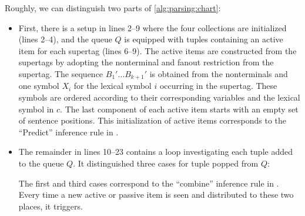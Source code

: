 \documentclass[../../document.tex]{subfiles}
\begin{document}
    Roughly, we can distinguish two parts of \cref{alg:parsing:chart}:
    \begin{itemize}
        \item First, there is a setup in lines 2--9 where the four collections are initialized (lines 2--4), and the queue \(Q\) is equipped with tuples containing an active item for each supertag (lines 6--9).
            The active items are constructed from the supertags by adopting the  nonterminal and fanout restriction from the supertag.
            The sequence \(B_1' \ldots B_{k+1}'\) is obtained from the  nonterminals and one symbol \(X_i\) for the lexical symbol \(i\) occurring in the supertag.
            These symbols are ordered according to their corresponding variables and the lexical symbol in \(c\).
            The last component of each active item starts with an empty set of sentence positions.
            This initialization of active items corresponds to the ``Predict'' inference rule in .
        \item
            The remainder in lines 10--23 contains a loop investigating each tuple added to the queue \(Q\).
            It distinguished three cases for tuple popped from \(Q\):
            The first and third cases correspond to the ``combine'' inference rule in .
            Every time a new active or passive item is seen and distributed to these two places, it triggers.
    \end{itemize}
\end{document}
